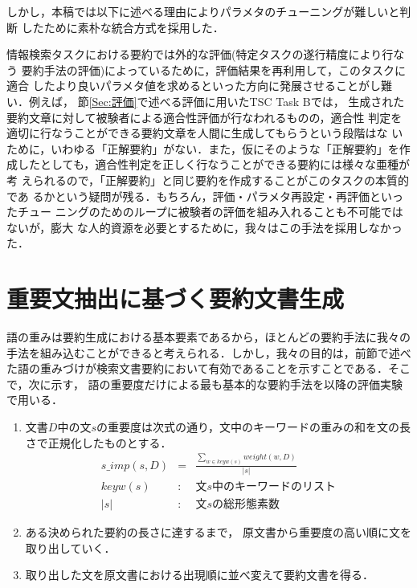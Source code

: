 しかし，本稿では以下に述べる理由によりパラメタのチューニングが難しいと判断
したために素朴な統合方式を採用した．

情報検索タスクにおける要約では外的な評価(特定タスクの遂行精度により行なう
要約手法の評価)によっているために，評価結果を再利用して，このタスクに適合
したより良いパラメタ値を求めるといった方向に発展させることがし難い．例えば，
節\ref{Sec:評価}で述べる評価に用いたTSC Task Bでは，
生成された要約文章に対して被験者による適合性評価が行なわれるものの，適合性
判定を適切に行なうことができる要約文章を人間に生成してもらうという段階はな
いために，いわゆる「正解要約」がない．また，仮にそのような「正解要約」を作
成したとしても，適合性判定を正しく行なうことができる要約には様々な亜種が考
えられるので，「正解要約」と同じ要約を作成することがこのタスクの本質的であ
るかという疑問が残る．もちろん，評価・パラメタ再設定・再評価といったチュー
ニングのためのループに被験者の評価を組み入れることも不可能ではないが，膨大
な人的資源を必要とするために，我々はこの手法を採用しなかった．



\section{重要文抽出に基づく要約文書生成}

語の重みは要約生成における基本要素であるから，ほとんどの要約手法に我々の
手法を組み込むことができると考えられる．しかし，我々の目的は，前節で述べ
た語の重みづけが検索文書要約において有効であることを示すことである．そこ
で，次に示す，
語の重要度だけによる最も基本的な要約手法を以降の評価実験で用いる．
\begin{enumerate}
 \item 文書$D$中の文$s$の重要度は次式の通り，文中のキーワードの重みの和を文の長さで正規化したものとする．
       \begin{eqnarray}
	s\_imp(s,D) & = & \frac{\displaystyle\sum_{w \in keyw(s)} weight(w,D)}{|s|} \\
	keyw(s) & : & \mbox{文$s$中のキーワードのリスト}\nonumber\\
        |s| & : & \mbox{文$s$の総形態素数}\nonumber
       \end{eqnarray}

 \item ある決められた要約の長さに達するまで，
       原文書から重要度の高い順に文を取り出していく．
 \item 取り出した文を原文書における出現順に並べ変えて要約文書を得る．
\end{enumerate}

